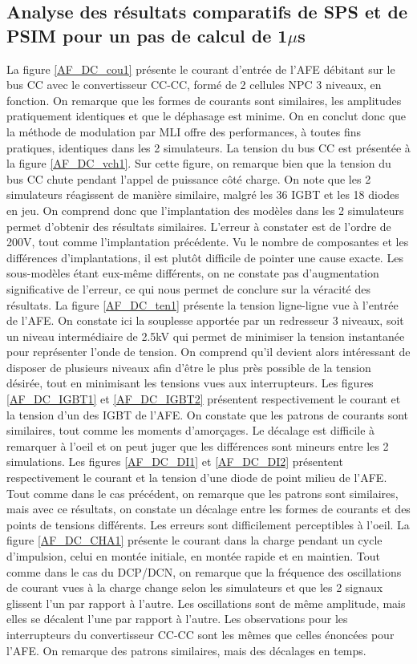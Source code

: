 \subsection{Analyse des résultats comparatifs de SPS et de PSIM pour un pas de calcul de 1$\mu$s}
La figure \ref{AF_DC_cou1} présente le courant d'entrée de l'AFE débitant sur le bus CC avec le convertisseur CC-CC, formé de 2 cellules NPC 3 niveaux, en fonction. On remarque que les formes de courants sont similaires, les amplitudes pratiquement identiques et que le déphasage est minime. On en conclut donc que la méthode de modulation par MLI offre des performances, à toutes fins pratiques, identiques dans les 2 simulateurs.
La tension du bus CC est présentée à la figure \ref{AF_DC_vch1}. Sur cette figure, on remarque bien que la tension du bus CC chute pendant l'appel de puissance côté charge. On note que les 2 simulateurs réagissent de manière similaire, malgré les 36 IGBT et les 18 diodes en jeu. On comprend donc que l'implantation des modèles dans les 2 simulateurs permet d'obtenir des résultats similaires. L'erreur à constater est de l'ordre de 200V, tout comme l'implantation précédente. Vu le nombre de composantes et les différences d'implantations, il est plutôt difficile de pointer une cause exacte. Les sous-modèles étant eux-même différents, on ne constate pas d'augmentation significative de l'erreur, ce qui nous permet de conclure sur la véracité des résultats. 
La figure \ref{AF_DC_ten1} présente la tension ligne-ligne vue à l'entrée de l'AFE. On constate ici la souplesse apportée par un redresseur 3 niveaux, soit un niveau intermédiaire de 2.5kV qui permet de minimiser la tension instantanée pour représenter l'onde de tension. On comprend qu'il devient alors intéressant de disposer de plusieurs niveaux afin d'être le plus près possible de la tension désirée, tout en minimisant les tensions vues aux interrupteurs.
Les figures \ref{AF_DC_IGBT1} et \ref{AF_DC_IGBT2} présentent respectivement le courant et la tension d'un des IGBT de l'AFE. On constate que les patrons de courants sont similaires, tout comme les moments d'amorçages. Le décalage est difficile à remarquer à l'oeil et on peut juger que les différences sont mineurs entre les 2 simulations. 
Les figures \ref{AF_DC_DI1} et \ref{AF_DC_DI2} présentent respectivement le courant et la tension d'une diode de point milieu de l'AFE. Tout comme dans le cas précédent, on remarque que les patrons sont similaires, mais avec ce résultats, on constate un décalage entre les formes de courants et des points de tensions différents. Les erreurs sont difficilement perceptibles à l'oeil. 
La figure \ref{AF_DC_CHA1} présente le courant dans la charge pendant un cycle d'impulsion, celui en montée initiale, en montée rapide et en maintien. Tout comme dans le cas du DCP/DCN, on remarque que la fréquence des oscillations de courant vues à la charge change selon les simulateurs et que les 2 signaux glissent l'un par rapport à l'autre. Les oscillations sont de même amplitude, mais elles se décalent l'une par rapport à l'autre.
Les observations pour les interrupteurs du convertisseur CC-CC sont les mêmes que celles énoncées pour l'AFE. On remarque des patrons similaires, mais des décalages en temps.
\clearpage

